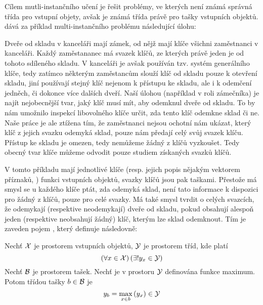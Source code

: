Cílem mutli-instančního učení je řešit problémy, ve kterých není známá správná třída pro vstupní objety, avšak je známá třída právě pro tašky vstupních objektů. \cite{dietterich_solving_1997} dává za příklad multi-instančního problému následující úlohu:

\begin{example}
	Dveře od skladu v kanceláři mají zámek, od nějž mají klíče všichni zaměstnanci v kanceláři. Každý zaměstananec má svazek klíčů, ze kterých právě jeden je od tohoto sdíleného skladu. V kanceláři je avšak používán tzv. systém generálního klíče, tedy zatímco některým zaměstancům slouží klíč od skladu pouze k otevření skladu, jiní používají stejný klíč nejenom k přístupu ke skladu, ale i k odemčení jedněch, či dokonce více dalších dveří. Naší úlohou (například v roli zámečníka) je najít nejobecnější tvar, jaký klíč musí mít, aby odemknul dveře od skladu. To by nám umožnilo inspekcí libovolného klíče určit, zda tento klíč odemkne sklad či ne. Naše práce je ale ztížena tím, že zaměstnanci nejsou ochotní nám ukázat, který klíč z jejich svazku odemyká sklad, pouze nám předají celý svůj svazek klíču. Přístup ke skladu je omezen, tedy nemůžeme žádný z klíčů vyzkoušet. Tedy obecný tvar klíče můžeme odvodit pouze studiem získaných svazků klíčů.
\end{example}

V tomto příkladu mají jednotlivé klíče (resp. jejich popis nějakým vektorem příznaků, ) funkci vstupních objektů, svazky klíčů jsou pak taškami. Přestože má smysl se u každého klíče ptát, zda odemyká sklad, není tato informace k dispozici pro žádný z klíčů, pouze pro celé svazky. Má také smysl tvrdit o celých svazcích, že odemykají (respektive neodemykají) dveře od skladu, pokud obsahují alespoň jeden (respektive neobsahují žádný) klíč, kterým lze sklad odemknout. Tím je zaveden pojem , který \cite{dietterich_solving_1997} definuje následovně:

\begin{define}\label{baglabel}
	Nechť \( \mathcal X \) je prostorem vstupních objektů, \( \mathcal Y \) je prostorem tříd, kde platí
	\[ \left( \forall x \in \mathcal X \right) \left( \exists ! y_x \in \mathcal Y \right) \]
	Nechť \( \mathcal B \) je prostorem tašek. Nechť je v prostoru \( \mathcal Y \) definována funkce maximum. Potom třídou tašky \( b \in \mathcal B \) je
	\[ y_b = \max_{x \in b} \left( y_x \right) \in \mathcal Y \]
\end{define}

